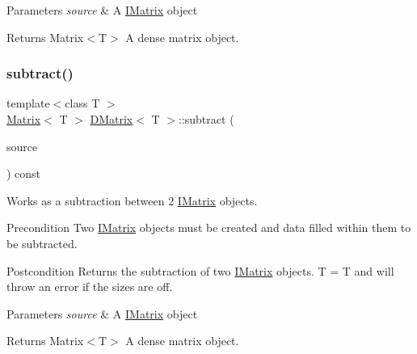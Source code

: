 \begin{DoxyParams}{Parameters}
{\em source} & A \mbox{\hyperlink{class_i_matrix}{I\+Matrix}} object \\
\hline
\end{DoxyParams}
\begin{DoxyReturn}{Returns}
Matrix$<$\+T$>$ A dense matrix object. 
\end{DoxyReturn}
\mbox{\label{class_d_matrix_a1f25b5ba98d6b13bc1bf660df672bf33}} 
\subsubsection{\texorpdfstring{subtract()}{subtract()}\hspace{0.1cm}{\footnotesize\ttfamily [4/6]}}
{\footnotesize\ttfamily template$<$class T $>$ \\
\mbox{\hyperlink{class_matrix}{Matrix}}$<$ T $>$ \mbox{\hyperlink{class_d_matrix}{D\+Matrix}}$<$ T $>$\+::subtract (\begin{DoxyParamCaption}\item[{const \mbox{\hyperlink{class_i_matrix}{I\+Matrix}}$<$ \mbox{\hyperlink{class_u_matrix}{U\+Matrix}}$<$ T $>$, T $>$ \&}]{source }\end{DoxyParamCaption}) const}



Works as a subtraction between 2 \mbox{\hyperlink{class_i_matrix}{I\+Matrix}} objects. 

\begin{DoxyPrecond}{Precondition}
Two \mbox{\hyperlink{class_i_matrix}{I\+Matrix}} objects must be created and data filled within them to be subtracted. 
\end{DoxyPrecond}
\begin{DoxyPostcond}{Postcondition}
Returns the subtraction of two \mbox{\hyperlink{class_i_matrix}{I\+Matrix}} objects. T = T and will throw an error if the sizes are off.
\end{DoxyPostcond}

\begin{DoxyParams}{Parameters}
{\em source} & A \mbox{\hyperlink{class_i_matrix}{I\+Matrix}} object \\
\hline
\end{DoxyParams}
\begin{DoxyReturn}{Returns}
Matrix$<$\+T$>$ A dense matrix object. 
\end{DoxyReturn}
\mbox{\label{class_d_matrix_adb9cbdf78c3bf9d77e39cda4f4e04a08}} 
